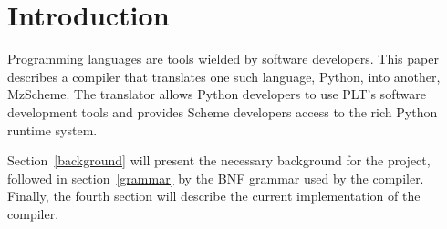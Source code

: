 
\section{Introduction}


Programming languages are tools wielded by software developers.  This paper describes a compiler that translates one such language, Python, into another, MzScheme.  The translator allows Python developers to use PLT's software development tools and provides Scheme developers access to the rich Python runtime system.

  Section~\ref{background} will present the necessary background for the project, followed in section~\ref{grammar} by the BNF grammar used by the compiler.  Finally, the fourth section will describe the current implementation of the compiler.
